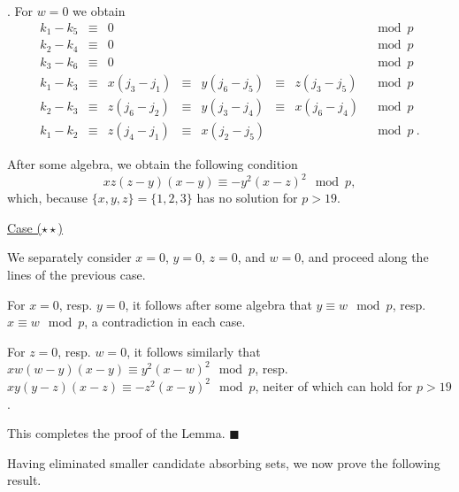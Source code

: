 . For $w=0$ we obtain
\begin{equation}\begin{array}{ccccccccc}
k_1-k_5 &\equiv& 0 & {}& {}&{}&{}&\mod p
\\
k_2-k_4 &\equiv& 0 & {}& {}&{}&{}&\mod p\\
k_3-k_6 &\equiv& 0 & {}& {}&{}&{}&\mod p\\
k_1-k_3 &\equiv& x(j_3-j_1)& \equiv& y(j_6-j_5)& \equiv&
z(j_3-j_5) &\mod p
\\
k_2-k_3 &\equiv& z(j_6-j_2) &\equiv&  y(j_3-j_4) &\equiv&
x(j_6-j_4) &\mod
p\\
k_1-k_2 &\equiv& z(j_4-j_1) &\equiv& x(j_2-j_5) & {}&{}&\mod p~.
\end{array}\end{equation}

After some algebra, we obtain the following condition
\begin{equation}
xz(z-y)(x-y) \equiv -y^2(x-z)^2 \mod p,
\end{equation}
which, because $\{x,y,z\}=\{1,2,3\}$ has no solution for $p>19$.%

\underline{Case ($\star\star$)}

We separately consider $x=0$, $y=0$, $z=0$, and $w=0$, and proceed
along the lines of the previous case.%

For $x=0$, resp. $y=0$, it follows after some algebra that $y \equiv
w \mod p$, resp. $x \equiv w \mod p$, a contradiction in each case.


For $z=0$, resp. $w=0$, it follows similarly that $xw(w-y)(x-y)
\equiv y^2(x-w)^2 \mod p$, resp. $xy(y-z)(x-z) \equiv -z^2(x-y)^2
\mod p$, neiter of which can hold for $p>19$. %


This completes the proof of the Lemma. \hfill$\blacksquare$

Having eliminated smaller candidate absorbing sets, we now prove the
following result.

